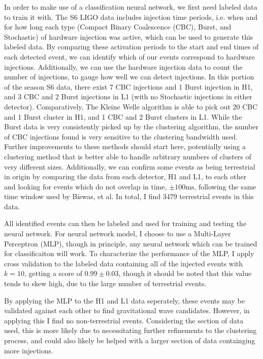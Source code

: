 \documentclass{article}
\begin{document}
In order to make use of a classification neural network, we first need labeled data to train it with. The S6 LIGO data includes injection time periods, i.e. when and for how long each type (Compact Binary Coalescence (CBC), Burst, and Stochastic) of hardware injection was active, which can be used to generate this labeled data. By comparing these activation periods to the start and end times of each detected event, we can identify which of our events correspond to hardware injections. Additionally, we can use the hardware injection data to count the number of injections, to gauge how well we can detect injections. In this portion of the season S6 data, there exist 7 CBC injections and 1 Burst injection in H1, and 3 CBC and 2 Burst injections in L1 (with no Stochastic injections in either detector). Comparatively, The Kleine Welle algorithm is able to pick out 20 CBC and 1 Burst cluster in H1, and 1 CBC and 2 Burst clusters in L1. While the Burst data is very consistently picked up by the clustering algorithm, the number of CBC injections found is very sensitive to the clustering bandwidth used. Further improvements to these methods should start here, potentially using a clustering method that is better able to handle arbitrary numbers of clusters of very different sizes. Additionally, we can confirm some events as being terrestrial in origin by comparing the data from each detector, H1 and L1, to each other and looking for events which do not overlap in time, $\pm100\mathrm{ms}$, following the same time window used by Biswas, et al\citep{Biswas2013}. In total, I find 3479 terrestrial events in this data.

All identified events can then be labeled and used for training and testing the neural network. For neural network model, I choose to use a Multi-Layer Perceptron (MLP), though in principle, any neural network which can be trained for classificaiton will work. To characterize the performance of the MLP, I apply cross validation to  the labeled data containing all of the injected events with $k=10$, getting a score of $0.99\pm0.03$, though it should be noted that this value tends to skew high, due to the large number of terrestrial events.

By applying the MLP to the H1 and L1 data seperately, these events may be validated against each other to find gravitational wave candidates. However, in applying this I find no non-terrestrial events. Considering the section of data used, this is more likely due to necessitating further refinements to the clustering process, and could also likely be helped with a larger section of data containging more injections.
\end{document}
